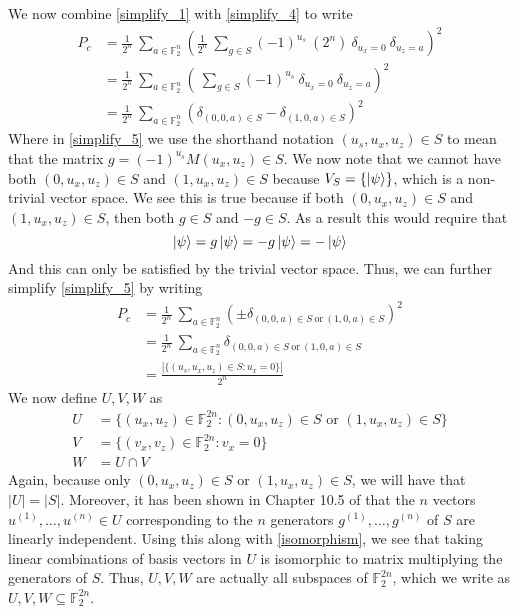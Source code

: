 \message{ !name(report_1.tex)}\documentclass[11pt]{article}
\theoremstyle{definition}
\theoremstyle{plain}
\begin{document}
We now combine {\ref{simplify_1}} with {\ref{simplify_4}} to write
\begin{align}
P_c &= \frac{1}{2^{n}} \  \sum\limits_{a \in \mathbb{F}_2^n}
        {\left( \frac{1}{2^n} \ \sum\limits_{g \in S}
      {(-1)}^{u_s} \ (2^n) \ \delta_{u_x = 0} \ \delta_{u_z = a}  \right)}^2 \\
    &=  \frac{1}{2^{n}} \  \sum\limits_{a \in \mathbb{F}_2^n}
      {\left( \ \sum\limits_{g \in S}
      {(-1)}^{u_s} \ \delta_{u_x = 0} \ \delta_{u_z = a}  \right)}^2 \\
    &=  \frac{1}{2^{n}} \  \sum\limits_{a \in \mathbb{F}_2^n}
      {\left( \delta_{(0, 0, a) \in S} -
      \delta_{(1, 0, a)\in S} \right)}^2 \label{simplify_5}
\end{align}
Where in {\ref{simplify_5}} we use the shorthand notation $(u_s, u_x, u_z) \in S$ to mean that the matrix $g = {(-1)}^{u_s} M(u_x, u_z) \in S$. We now note that we cannot have both $(0, u_x, u_z) \in S$ and $(1, u_x, u_z) \in S$ because $V_S = \{ \ket{\psi} \}$, which is a non-trivial vector space. We see this is true because if both $(0, u_x, u_z) \in S$ and $(1, u_x, u_z) \in S$, then both $g \in S$ and $-g \in S$. As a result this would require that
\begin{equation}
  \ket{\psi} = g \ket{\psi} = -g \ket{\psi} = - \ket{\psi}
\end{equation}
And this can only be satisfied by the trivial vector space. Thus, we can further simplify {\ref{simplify_5}} by writing
\begin{align}
  P_c &=  \frac{1}{2^{n}} \  \sum\limits_{a \in \mathbb{F}_2^n}
      {\left( \pm \delta_{(0, 0, a) \in S \ \text{or} \ (1, 0, a) \in S } \right)}^2 \\
      &= \frac{1}{2^{n}} \  \sum\limits_{a \in \mathbb{F}_2^n}
        \delta_{(0, 0, a) \in S \ \text{or} \ (1, 0, a) \in S} \\ 
      &= \frac{ |\{(u_s, u_x, u_z) \in S : u_x = 0 \}| } {2^n} 
\end{align}
We now define $U, V, W$ as
\begin{align}
  U &= \{(u_x, u_z) \in \mathbb{F}_2^{2n} : (0, u_x, u_z) \in S \text{ or }
  (1, u_x, u_z) \in S \} \label{simplify_6}\\
  V &= \{(v_x, v_z) \in \mathbb{F}_2^{2n} : v_x = 0 \} \label{simplify_7}\\
  W &= U \cap V \label{simplify_8}
\end{align}
Again, because only $(0, u_x, u_z) \in S$ or $(1, u_x, u_z) \in S$, we will have that $|U| = |S|$. Moreover, it has been shown in Chapter 10.5 of {\cite{nc}} that the $n$ vectors $u^{(1)}, \ldots, u^{(n)} \in U$ corresponding to the $n$ generators $g^{(1)}, \ldots, g^{(n)}$ of $S$ are linearly independent. Using this along with {\ref{isomorphism}}, we see that taking linear combinations of basis vectors in $U$ is isomorphic to matrix multiplying the generators of $S$. Thus, $U, V, W$ are actually all subspaces of $\mathbb{F}_2^{2n}$, which we write as $U, V, W \subseteq \mathbb{F}_2^{2n}$.
\end{document}
